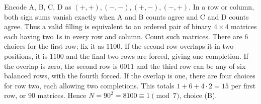 Encode A, B, C, D as $(+,+),(-,-),(+,-),(-,+)$. In a row or column, both sign sums vanish exactly when A and B counts agree and C and D counts agree. Thus a valid filling is equivalent to an ordered pair of binary $4\times4$ matrices each having two $1$s in every row and column. Count such matrices. There are $6$ choices for the first row; fix it as $1100$. If the second row overlaps it in two positions, it is $1100$ and the final two rows are forced, giving one completion. If the overlap is zero, the second row is $0011$ and the third row can be any of six balanced rows, with the fourth forced. If the overlap is one, there are four choices for row two, each allowing two completions. This totals $1+6+4\cdot2=15$ per first row, or $90$ matrices. Hence $N=90^2=8100\equiv\boxed1\pmod7$, choice (B).
